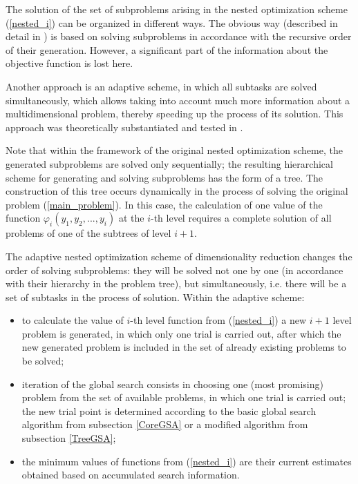 \documentclass[entropy,article,submit,moreauthors,pdftex]{Definitions/mdpi}
\begin{document}
The solution of the set of subproblems arising in the nested optimization scheme  (\ref{nested_i}) can be organized in different ways. 
The obvious way (described in detail in \cite{Grishagin2001,Grishagin2015}) is based on solving subproblems in accordance with the recursive order of their generation. However, a significant part of the information about the objective function is lost here.

Another approach is an adaptive scheme, in which all subtasks are solved simultaneously, which allows taking into account much more information about a multidimensional problem, thereby speeding up the process of its solution. 
This approach was theoretically substantiated and tested in  \cite{Grishagin2016,Grishagin2016_1,Grishagin2018}. 

Note that within the framework of the original nested optimization scheme, the generated subproblems are solved only sequentially; the resulting hierarchical scheme for generating and solving subproblems has the form of a tree. The construction of this tree occurs dynamically in the process of solving the original problem (\ref{main_problem}). In this case, the calculation of one value of the function $\varphi_i(y_1,y_2,...,y_i)$ at the $i$-th level requires a complete solution of all problems of one of the subtrees of level  $i+1$.

The adaptive nested optimization scheme of dimensionality reduction changes the order of solving subproblems: they will be solved not one by one (in accordance with their hierarchy in the problem tree), but simultaneously, i.e. there will be a set of subtasks in the process of solution. Within the adaptive scheme:
\begin{itemize}
	\item 
to calculate the value of $i$-th level function from (\ref{nested_i}) a new $i+1$ level problem is generated, in which only one trial is carried out, after which the new generated problem is included in the set of already existing problems to be solved;
	\item 
	iteration of the global search consists in choosing one (most promising) problem from the set of available problems, in which one trial is carried out; the new trial point is determined according to the basic global search algorithm from subsection \ref{CoreGSA} or a modified algorithm from subsection  \ref{TreeGSA};
	\item
the minimum values of functions from  (\ref{nested_i}) are their current estimates obtained based on accumulated search information.
\end{itemize}
\end{document}
